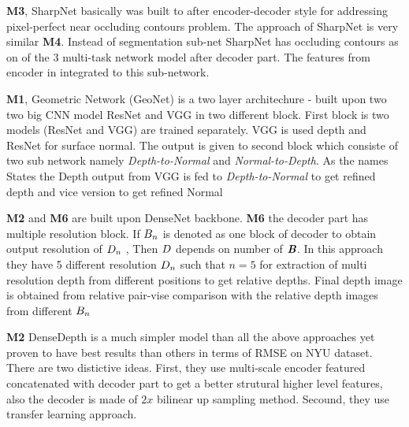 \textbf{M3}, SharpNet basically was built to after encoder-decoder style for addressing pixel-perfect near occluding contours  problem. The approach of SharpNet is very similar \textbf{M4}. Instead of segmentation sub-net SharpNet has  occluding contours as on of the 3 multi-task network model after decoder part. The features from encoder in integrated to this sub-network. 

\textbf{M1}, Geometric Network (GeoNet) is a two layer architechure - built upon two two big CNN model ResNet and VGG in two different block. First block is two models (ResNet and VGG) are trained separately. VGG is used depth and ResNet for surface normal. The output is given to second block which consiste of two sub network namely \textit{Depth-to-Normal} and \textit{Normal-to-Depth}. As the names States the Depth output from VGG is fed to  \textit{Depth-to-Normal} to get refined depth and vice version to get refined Normal

\textbf{M2} and \textbf{M6} are built upon DenseNet backbone. \textbf{M6}  the decoder part has multiple resolution block. If \(\textbf{\textit{$B_n$}}\) is denoted as one block of decoder to obtain output resolution of \(\textbf{\textit{$D_n$}}\) , Then  \(\textbf{\textit{$D$}}\) depends on number of  \(\textbf{\textit{B}}\). In this approach they have 5 different resolution \(\textbf{\textit{$D_n$}}\)  such that \(n = 5\) for extraction of multi resolution depth from different positions to get relative depths. Final depth image is obtained from relative pair-vise comparison with the relative depth images from different \(\textbf{\textit{$B_n$}}\)

\textbf{M2} DenseDepth is a much simpler model than all the above approaches yet proven to have best results than others in terms of RMSE on NYU dataset. There are two distictive  ideas. First, they use multi-scale encoder featured concatenated with decoder part to get a better strutural higher level features, also the decoder is made of \(2 x \) bilinear up sampling method. Secound, they use transfer learning approach.  

